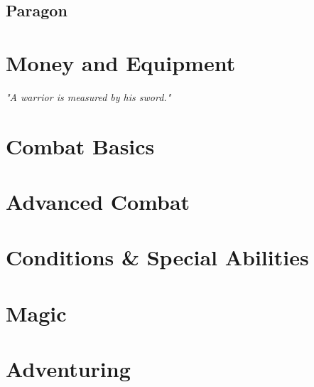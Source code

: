 \documentclass[9pt]{report}
\newcommand{\quot}[1]{\emph{#1}\medskip}
\begin{document}
\section{Paragon}






\chapter{Money and Equipment}
\vspace*{-36pt}
\begin{flushright}\quot{"A warrior is measured by his sword."} \end{flushright}






\chapter{Combat Basics}




\chapter{Advanced Combat}








\chapter{Conditions \& Special Abilities}





\chapter{Magic}







%



\chapter{Adventuring}







\end{document}
